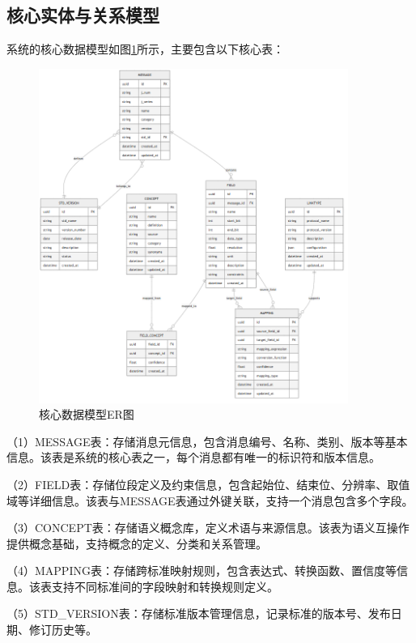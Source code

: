 \subsection{核心实体与关系模型}

系统的核心数据模型如图\ref{fig:data_model}所示，主要包含以下核心表：

\begin{figure}[H]
    \centering
    \includegraphics[width=0.9\textwidth]{chapters/fig-0/data_model.png}
    \caption{核心数据模型ER图}
    \label{fig:data_model}
\end{figure}

（1）MESSAGE表：存储消息元信息，包含消息编号、名称、类别、版本等基本信息。该表是系统的核心表之一，每个消息都有唯一的标识符和版本信息。

（2）FIELD表：存储位段定义及约束信息，包含起始位、结束位、分辨率、取值域等详细信息。该表与MESSAGE表通过外键关联，支持一个消息包含多个字段。

（3）CONCEPT表：存储语义概念库，定义术语与来源信息。该表为语义互操作提供概念基础，支持概念的定义、分类和关系管理。

（4）MAPPING表：存储跨标准映射规则，包含表达式、转换函数、置信度等信息。该表支持不同标准间的字段映射和转换规则定义。

（5）STD\_VERSION表：存储标准版本管理信息，记录标准的版本号、发布日期、修订历史等。

